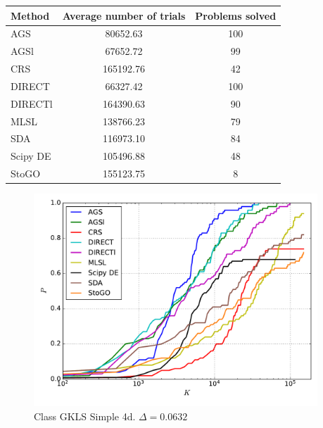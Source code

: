 \documentclass[a4paper]{article}
\begin{document}
\begin{tabular}{lcc}
\hline
 Method   &  Average number of trials  &  Problems solved  \\
\hline
 AGS      &          80652.63          &        100        \\
 AGSl     &          67652.72          &        99         \\
 CRS      &         165192.76          &        42         \\
 DIRECT   &          66327.42          &        100        \\
 DIRECTl  &         164390.63          &        90         \\
 MLSL     &         138766.23          &        79         \\
 SDA      &         116973.10          &        84         \\
 Scipy DE &         105496.88          &        48         \\
 StoGO    &         155123.75          &         8         \\
\hline
\end{tabular}
\begin{figure}[H]
  \center
  \includegraphics[width=0.95\textwidth]{../experiments/gklss4d_serg/cmc.pdf}
  \caption{Class GKLS Simple 4d. $\Delta=0.0632$}
\end{figure}
\end{document}
